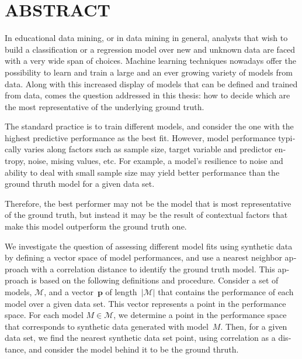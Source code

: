 %

\chapter*{ABSTRACT}\thispagestyle{headings}
%
\begin{otherlanguage}{english}

In educational data mining, or in data mining in general, analysts that wish to build a classification or a regression model over new and unknown data are faced with a very wide span of choices.  Machine learning techniques nowadays offer the possibility to learn and train a large and an ever growing variety of models from data. Along with this increased display of models that can be defined and trained from data, comes the question addressed in this thesis: how to decide which are the most representative of the underlying ground truth.

The standard practice is to train different models, and consider the one with the highest predictive performance as the best fit. However, model performance typically varies along factors such as sample size, target variable and predictor entropy, noise, mising values, etc.  For example, a model's resilience to noise and ability to deal with small sample size may yield better performance than the ground thruth model for a given data set.  

Therefore, the best performer may not be the model that is most representative of the ground truth, but instead it may be the result of contextual factors that make this model outperform the ground truth one.  

We investigate the question of assessing different model fits using synthetic data by defining a vector space of model performances, and use a nearest neighbor approach with a correlation distance to identify the ground truth model.  This approach is based on the following definitions and procedure.  Consider a set of models, $\mathcal{M}$, and a vector~$\mathbf{p}$ of length~$|\mathcal{M}|$ that contains the performance of each model over a given data set.  This vector represents a point in the performance space.  For each model $M \in \mathcal{M}$, we determine a point in the performance space that corresponds to synthetic data generated with model~$M$.  Then, for a given data set, we find the nearest synthetic data set point, using correlation as a distance, and consider the model behind it to be the ground thruth.


\end{otherlanguage}
